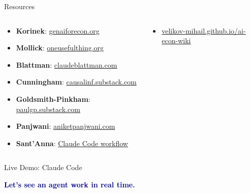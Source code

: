 \documentclass[aspectratio=169, 11pt]{beamer}
\begin{document}
\begin{frame}[shrink=5]{Resources}
\begin{columns}[T]
\begin{keyinsight}
\begin{itemize}
  \item \textbf{Korinek}: \href{https://genaiforecon.org}{genaiforecon.org}
  \item \textbf{Mollick}: \href{https://oneusefulthing.org}{oneusefulthing.org}
  \item \textbf{Blattman}: \href{https://claudeblattman.com}{claudeblattman.com}
  \item \textbf{Cunningham}: \href{https://causalinf.substack.com}{causalinf.substack.com}
  \item \textbf{Goldsmith-Pinkham}: \href{https://paulgp.substack.com}{paulgp.substack.com}
  \item \textbf{Panjwani}: \href{https://aniketpanjwani.com/}{aniketpanjwani.com}
  \item \textbf{Sant'Anna}: \href{https://psantanna.com/claude-code-my-workflow/}{Claude Code workflow}
\end{itemize}
\end{keyinsight}

\begin{keyinsight}
\begin{itemize}
  \item \href{https://velikov-mihail.github.io/ai-econ-wiki/}{velikov-mihail.github.io/ai-econ-wiki}
\end{itemize}
\end{keyinsight}
\end{columns}
\end{frame}

\begin{frame}{Live Demo: Claude Code}
\vfill
\begin{center}
{\LARGE\bfseries\textcolor{darkblue}{Let's see an agent work in real time.}}
\end{center}
\vspace{1cm}
\begin{center}
\end{center}
\vfill
\end{frame}
\end{document}
